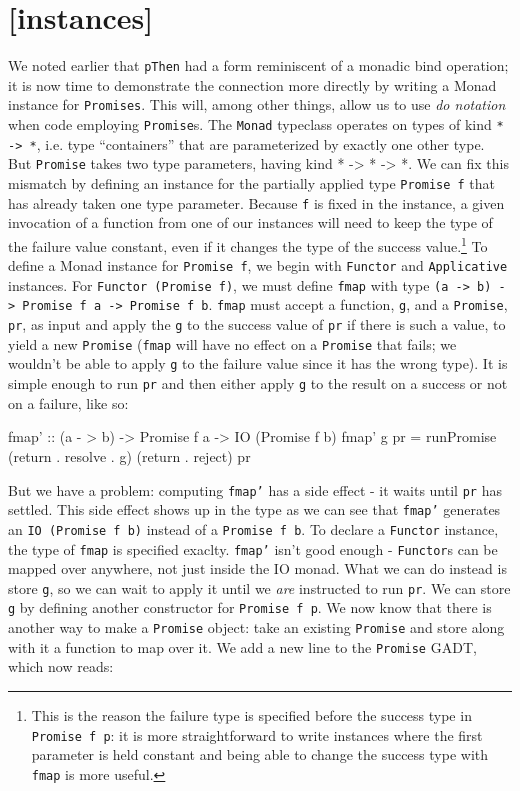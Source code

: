 \documentclass[12pt, english, letterpaper]{kuthesis}
\newcommand{\lit}[1]{\texttt{#1}}
\begin{document}
\section*{[instances]}
We noted earlier that \lit{pThen} had a form reminiscent of a monadic bind operation; it is now time to demonstrate the connection more directly by writing a Monad instance for \lit{Promises}.  This will, among other things, allow us to use \emph{do notation} when code employing \lit{Promise}s.  The \lit{Monad} typeclass operates on types of kind \lit{* -> *}, i.e. type ``containers'' that are parameterized by exactly one other type.  But \lit{Promise} takes two type parameters, having kind {* -> * -> *}.  We can fix this mismatch by defining an instance for the partially applied type \lit{Promise f} that has already taken one type parameter.  Because \lit f is fixed in the instance, a given invocation of a function from one of our instances will need to keep the type of the failure value constant, even if it changes the type of the success value.\footnote{This is the reason the failure type is specified before the success type in \lit{Promise f p}: it is more straightforward to write instances where the first parameter is held constant and being able to change the success type with \lit{fmap} is more useful.}
To define a Monad instance for \lit{Promise f}, we begin with \lit{Functor} and \lit{Applicative} instances.  For \lit{Functor (Promise f)}, we must define \lit{fmap} with type \lit{(a -> b) -> Promise f a -> Promise f b}.  \lit{fmap} must accept a function, \lit g, and a \lit{Promise}, \lit{pr}, as input and apply the \lit g to the success value of \lit{pr} if there is such a value, to yield a new \lit{Promise} (\lit{fmap} will have no effect on a \lit{Promise} that fails; we wouldn't be able to apply \lit g to the failure value since it has the wrong type).  It is simple enough to run \lit{pr} and then either apply \lit g to the result on a success or not on a failure, like so:
\begin{code}
  fmap' :: (a - > b) -> Promise f a -> IO (Promise f b)
  fmap' g pr = runPromise (return . resolve . g) (return . reject) pr
\end{code}
But we have a problem: computing \lit{fmap'} has a side effect - it waits until \lit{pr} has settled.  This side effect shows up in the type as we can see that \lit{fmap'} generates an \lit{IO (Promise f b)} instead of a \lit{Promise f b}.  To declare a \lit{Functor} instance, the type of \lit{fmap} is specified exaclty.  \lit{fmap'} isn't good enough  - \lit{Functor}s can be mapped over anywhere, not just inside the IO monad.  What we can do instead is store \lit g, so we can wait to apply it until we \emph{are} instructed to run \lit{pr}.  We can store \lit g by defining another constructor for \lit{Promise f p}.  We now know that there is another way to make a \lit{Promise} object: take an existing \lit{Promise} and store along with it a function to map over it.  We add a new line to the \lit{Promise} GADT, which now reads:
\end{document}
